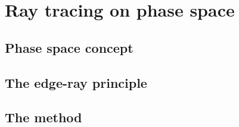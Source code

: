 \chapter{Ray tracing on phase space}
\section{Phase space concept}
\section{The edge-ray principle}
\section{The method}

